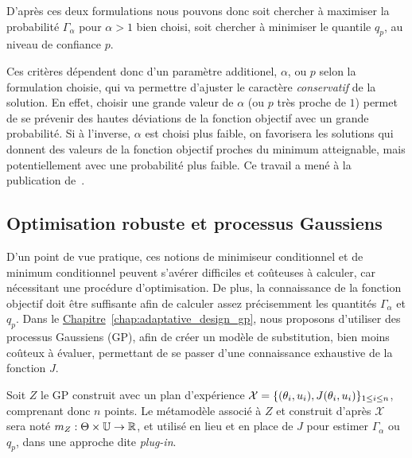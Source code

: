 \documentclass[../../Main_ManuscritThese.tex]{subfiles}
\newcommand{\frchap}[1]{\hyperref[#1]{Chapitre}~\ref{#1}}
\begin{document}
D'après ces deux formulations nous pouvons donc soit chercher à
maximiser la probabilité $\Gamma_{\alpha}$ pour $\alpha > 1$ bien
choisi, soit chercher à minimiser le quantile $q_p$, au niveau de
confiance $p$.

Ces critères dépendent donc d'un paramètre additionel, $\alpha$, ou
$p$ selon la formulation choisie, qui va permettre d'ajuster le
caractère \emph{conservatif} de la solution. En effet, choisir une
grande valeur de $\alpha$ (ou $p$ très proche de $1$) permet de se
prévenir des hautes déviations de la fonction objectif avec un grande
probabilité. Si à l'inverse, $\alpha$ est choisi plus faible, on
favorisera les solutions qui donnent des valeurs de la fonction
objectif proches du minimum atteignable, mais potentiellement avec une
probabilité plus faible.  Ce travail a mené à la publication
de~\cite{trappler_robust_2020}.
  
\subsection*{Optimisation robuste et processus Gaussiens}
D'un point de vue pratique, ces notions de minimiseur conditionnel et
de minimum conditionnel peuvent s'avérer difficiles et coûteuses à
calculer, car nécessitant une procédure d'optimisation. De plus, la
connaissance de la fonction objectif doit être suffisante afin de
calculer assez précisemment les quantités $\Gamma_{\alpha}$ et $q_p$.
Dans le \frchap{chap:adaptative_design_gp}, nous proposons d'utiliser
des processus Gaussiens (GP), afin de créer un modèle de substitution,
bien moins coûteux à évaluer, permettant de se passer d'une
connaissance exhaustive de la fonction $J$.

Soit $Z$ le GP construit avec un plan d'expérience
$\mathcal{X}=\{(\theta_i, u_i), J(\theta_i, u_i)\}_{1\leq i \leq n}$,
comprenant donc $n$ points.  Le métamodèle associé à $Z$ et construit
d'après $\mathcal{X}$ sera noté
$m_Z:\Theta\times \mathbb{U} \rightarrow \mathbb{R}$, et utilisé en lieu
et en place de $J$ pour estimer $\Gamma_{\alpha}$ ou $q_p$, dans une
approche dite \emph{plug-in}.
\end{document}
